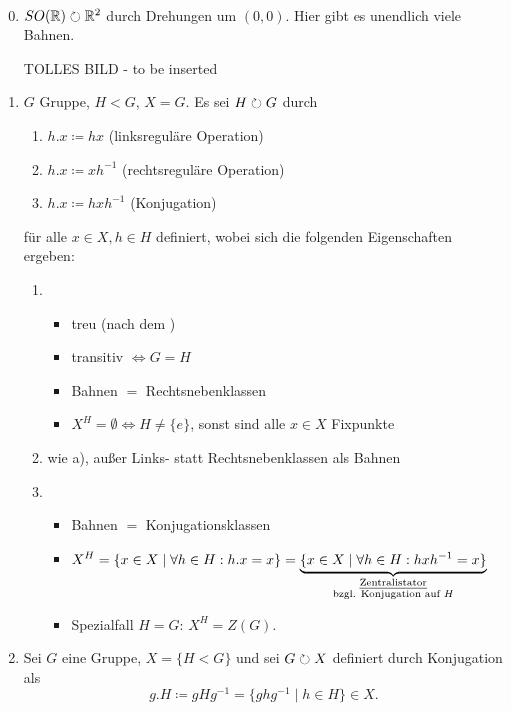\documentclass[12pt,a4paper]{scrartcl}
\begin{document}
\begin{bsp}~
	\begin{enumerate}
		\setcounter{enumi}{-1}
		\item $SO(\mathbb R) \circlearrowright \mathbb R^2$ durch Drehungen um $(0,0)$. Hier gibt es unendlich viele Bahnen.
		\begin{center}
			TOLLES BILD -  to be inserted
		\end{center}
		\item $G$ Gruppe, $H<G$, $X = G$. Es sei $H \circlearrowright G$ durch
		\begin{enumerate}[label=\alph*)]
			\item $h.x\coloneqq hx$ (linksreguläre Operation)
			\item $h.x\coloneqq xh^{-1}$ (rechtsreguläre Operation)
			\item $h.x\coloneqq hxh^{-1}$ (Konjugation)
		\end{enumerate}
		für alle $x\in X, h \in H$ definiert, wobei sich die folgenden Eigenschaften ergeben:
		\begin{enumerate}[label=\alph*)]
			\item \begin{itemize}[itemsep=-3pt]
				\item treu (nach dem )
				\item transitiv $\Leftrightarrow G = H$
				\item Bahnen $=$ Rechtsnebenklassen
				\item $X^H = \emptyset \Leftrightarrow H \neq \{e\}$, sonst sind alle $x \in X$ Fixpunkte
			\end{itemize}
			\item wie a), außer Links- statt Rechtsnebenklassen als Bahnen
			\item \begin{itemize}[itemsep=-3pt]
				\item Bahnen $=$ Konjugationsklassen
				\item ${\displaystyle X^H = \{x \in X \mid \forall h \in H: h.x = x \} = \underbrace{\{x \in X \mid \forall h \in H: hxh^{-1} = x \}}_{\substack{\text{\emph{Zentralistator}}\\\text{bzgl. Konjugation auf }H}}}$
				\item Spezialfall $H=G$: $X^H = Z(G)$.
			\end{itemize}
		\end{enumerate}
		\item Sei $G$ eine Gruppe, $X = \{H < G \}$ und sei $G \circlearrowright X$ definiert durch Konjugation als \[ g.H \coloneqq gHg^{-1} = \{ ghg^{-1} \mid h \in H \} \in X. \]

\end{enumerate}
\end{bsp}
\end{document}

